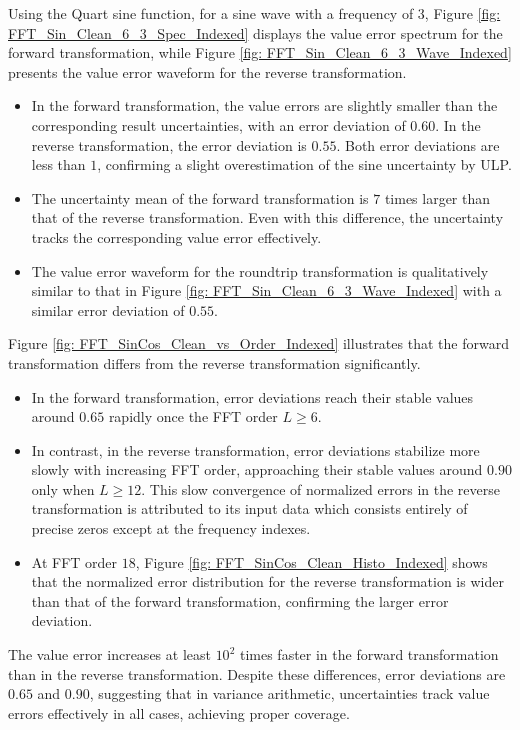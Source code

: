 \documentclass[twoside]{article}
\numberwithin{equation}{section}
\begin{document}
Using the Quart sine function, for a sine wave with a frequency of $3$, Figure \ref{fig: FFT_Sin_Clean_6_3_Spec_Indexed} displays the value error spectrum for the forward transformation, while Figure \ref{fig: FFT_Sin_Clean_6_3_Wave_Indexed} presents the value error waveform for the reverse transformation.
\begin{itemize}
\item In the forward transformation, the value errors are slightly smaller than the corresponding result uncertainties, with an error deviation of $0.60$.
In the reverse transformation, the error deviation is $0.55$.
Both error deviations are less than $1$, confirming a slight overestimation of the sine uncertainty by ULP.

\item The uncertainty mean of the forward transformation is $7$ times larger than that of the reverse transformation.
Even with this difference, the uncertainty tracks the corresponding value error effectively.

\item The value error waveform for the roundtrip transformation is qualitatively similar to that in  Figure \ref{fig: FFT_Sin_Clean_6_3_Wave_Indexed} with a similar error deviation of $0.55$.
\end{itemize}

Figure \ref{fig: FFT_SinCos_Clean_vs_Order_Indexed} illustrates that the forward transformation differs from the reverse transformation significantly.
\begin{itemize}
\item In the forward transformation, error deviations reach their stable values around $0.65$ rapidly once the FFT order $L \geq 6$. 

\item In contrast, in the reverse transformation, error deviations stabilize more slowly with increasing FFT order, approaching their stable values around $0.90$ only when $L \geq 12$.
This slow convergence of normalized errors in the reverse transformation is attributed to its input data which consists entirely of precise zeros except at the frequency indexes.

\item At FFT order $18$, Figure \ref{fig: FFT_SinCos_Clean_Histo_Indexed} shows that the normalized error distribution for the reverse transformation is wider than that of the forward transformation, confirming the larger error deviation.
\end{itemize}
The value error increases at least $10^2$ times faster in the forward transformation than in the reverse transformation.
Despite these differences, error deviations are $0.65$ and $0.90$, suggesting that in variance arithmetic, uncertainties track value errors effectively in all cases, achieving proper coverage.
\end{document}
